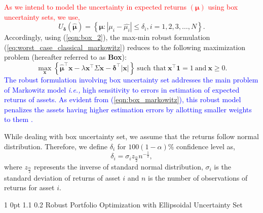 \documentclass[12pt]{article}
\makeatletter
\numberwithin{equation}{section}
\renewcommand{\subsection}{
  \@startsection
  {subsection}%
  {1}%
  {0pt}%
  {1.1\baselineskip}%
  {0.2\baselineskip}%
  {\sc \centering}%
}
\makeatother
\begin{document}
\textcolor{red}{As we intend to model the uncertainty in expected returns $\left(\boldsymbol{\mu}\right)$ using box uncertainty sets, we use,}
\begin{equation}
\label{eqn:box_2}
U_{\boldsymbol{\delta}}(\boldsymbol{\hat{\mu}})=\left\{\boldsymbol{\mu}: \left|\mu_{i}-\hat{\mu_{i}}\right|\leq \delta_{i}, i=1,2,3,\dots,N \right\}.
\end{equation}
Accordingly, using (\ref{eqn:box_2}), the max-min robust formulation (\ref{eq:worst_case_classical_markowitz}) reduces to the following maximization problem
(hereafter referred to as \textbf{Box}):
\begin{equation}
\label{eqn:box_markowitz}
\max\limits_{\mathbf{x}}\left\{\boldsymbol{\hat{\mu}}^{\top}\mathbf{x}-\lambda\mathbf{x^{\top}}\Sigma\mathbf{x}-\boldsymbol{\delta}^{\top}|\mathbf{x}|\right\}
~\text{such that}~\mathbf{x^{\top}}\mathbf{1}=1~\text{and}~\mathbf{x} \geq 0.
\end{equation}
\textcolor{blue}{The robust formulation involving box uncertainty set addresses the main problem of Markowitz model \textit{i.e.,} high sensitivity to errors in estimation of expected returns of assets. As evident from (\ref{eqn:box_markowitz}), this robust model penalizes the assets having higher estimation errors by allotting smaller weights to them \cite{Fabozzi07}. }

While dealing with box uncertainty set, we assume that the returns follow normal distribution. Therefore, we define $\delta_{i}$ for $100(1-\alpha)\%$ confidence level as, \[\displaystyle{\delta_{i}=\sigma_{i} z_{\frac{\alpha}{2}} n^{-\frac{1}{2}}},\]
where $z_{\frac{\alpha}{2}}$ represents the inverse of standard normal distribution, $\sigma_{i}$ is the standard deviation of returns of asset $i$ and $n$ is the number of observations of returns for asset $i$.

\subsection{Robust Portfolio Optimization with Ellipsoidal Uncertainty Set}
\end{document}

